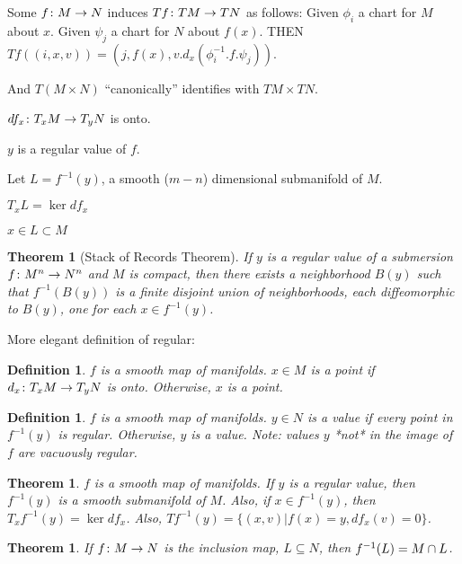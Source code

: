 \documentclass[11pt]{amsbook}
\newenvironment{dateenv}{
	\vspace{1em}
}{
	\vspace{1em}
}
\newcommand{\mydate}[4]{
	\newdate{#1}{#2}{#3}{#4}
	\begin{dateenv}
		\hfill\displaydate{#1}
	\end{dateenv}
}
\theoremstyle{mystyle} %
\newtheorem{thrm}[thm]{Theorem}
\newtheorem{defi}[thm]{Definition}
\numberwithin{thm}{section}
\begin{document}
Some $f\colon M \to N$ induces $Tf \colon TM \to TN$ as follows:
Given $\phi_i$ a chart for $M$ about $x$.
Given $\psi_j$ a chart for $N$ about $f(x)$.
THEN
$Tf((i, x, v)) = (j, f(x), v.d_x(\phi_i^{-1}.f.\psi_j))$.

And $T(M \times N)$ ``canonically'' identifies with $TM \times TN$.


\mydate{d2}{26}{9}{2016}



$df_x \colon T_xM \to T_yN$ is onto.

$y$ is a regular value of $f$.

Let $L = f^{-1}(y)$, a smooth ($m-n$) dimensional submanifold of $M$.

$T_xL = \ker df_x$

$x \in L \subset M$

\begin{thrm}[Stack of Records Theorem]
	If $y$ is a regular value of a submersion $f\colon M^n \to N^n$ and $M$ is compact, then there exists a neighborhood $B(y)$ such that $f^{-1}(B(y))$ is a finite disjoint union of neighborhoods, each diffeomorphic to $B(y)$, one for each $x \in f^{-1}(y)$.
\end{thrm}

\mydate{d3}{28}{9}{2016}

More elegant definition of regular:
\begin{defi}
	$f$ is a smooth map of manifolds.
	$x \in M$ is a  point if $d_x \colon T_xM \to T_yN$ is onto.  Otherwise, $x$ is a  point.
\end{defi}

\begin{defi}
	$f$ is a smooth map of manifolds.
	$y \in N$ is a  value if every point in $f^{-1}(y)$ is regular.  Otherwise, $y$ is a  value.  Note: values $y$ *not* in the image of $f$ are vacuously regular.
\end{defi}

\begin{thrm}
	$f$ is a smooth map of manifolds.
	If $y$ is a regular value, then $f^{-1}(y)$ is a smooth submanifold of $M$.
	Also, if $x \in f^{-1}(y)$, then $T_xf^{-1}(y) = \ker df_x$.
	Also, $Tf^{-1}(y) = \{ (x,v) | f(x)=y, df_x(v) = 0\}$.
\end{thrm}

\begin{thrm}
	If $f\colon M \to N$ is the inclusion map, $L \subseteq N$, then $f^{-1}(L) = M \cap L$.
\end{thrm}
\end{document}
